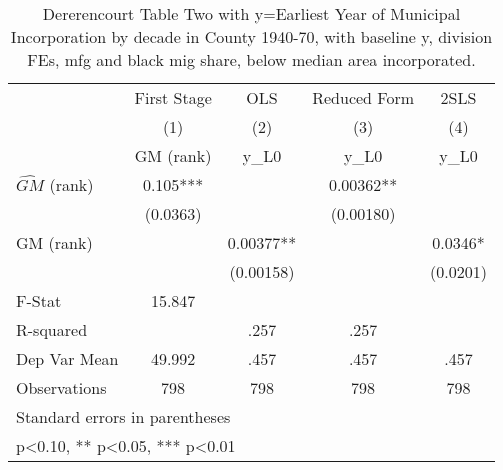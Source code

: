 \begin{table}[htbp]\centering
\def\sym#1{\ifmmode^{#1}\else\(^{#1}\)\fi}
\caption{Dererencourt Table Two with y=Earliest Year of Municipal Incorporation by decade in County 1940-70, with baseline y, division FEs, mfg and black mig share, below median area incorporated.}
\begin{tabular}{l*{4}{c}}
\toprule
                    & First Stage   &         OLS   &Reduced Form   &        2SLS   \\
                    &\multicolumn{1}{c}{(1)}&\multicolumn{1}{c}{(2)}&\multicolumn{1}{c}{(3)}&\multicolumn{1}{c}{(4)}\\
                    &\multicolumn{1}{c}{GM  (rank)}&\multicolumn{1}{c}{y\_L0}&\multicolumn{1}{c}{y\_L0}&\multicolumn{1}{c}{y\_L0}\\
\midrule
$\hat{GM}$ (rank)   &       0.105***&               &     0.00362** &               \\
                    &    (0.0363)   &               &   (0.00180)   &               \\
\addlinespace
GM  (rank)          &               &     0.00377** &               &      0.0346*  \\
                    &               &   (0.00158)   &               &    (0.0201)   \\
\midrule
F-Stat              &      15.847   &               &               &               \\
R-squared           &               &        .257   &        .257   &               \\
Dep Var Mean        &      49.992   &        .457   &        .457   &        .457   \\
Observations        &         798   &         798   &         798   &         798   \\
\bottomrule
\multicolumn{5}{l}{\footnotesize Standard errors in parentheses}\\
\multicolumn{5}{l}{\footnotesize * p<0.10, ** p<0.05, *** p<0.01}\\
\end{tabular}
\end{table}

